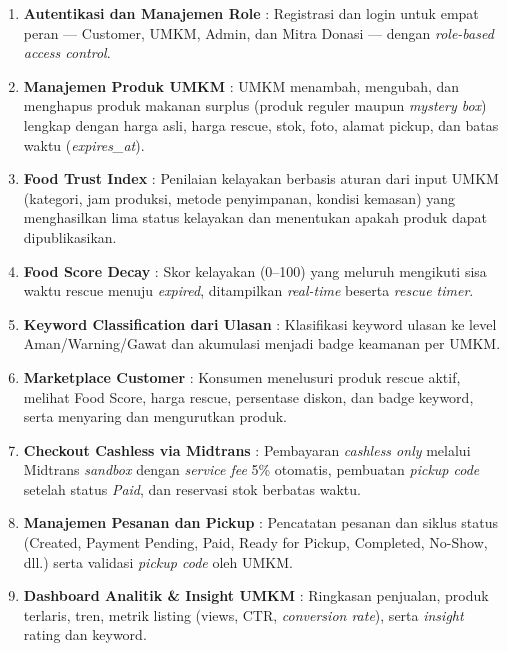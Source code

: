 \begin{enumerate}[leftmargin=*]
    \item \textbf{Autentikasi dan Manajemen Role} : Registrasi dan login untuk empat peran ---
    Customer, UMKM, Admin, dan Mitra Donasi --- dengan \textit{role-based access control}.

    \item \textbf{Manajemen Produk UMKM} : UMKM menambah, mengubah, dan menghapus produk makanan
    surplus (produk reguler maupun \textit{mystery box}) lengkap dengan harga asli, harga rescue,
    stok, foto, alamat pickup, dan batas waktu (\textit{expires\_at}).

    \item \textbf{Food Trust Index} : Penilaian kelayakan berbasis aturan dari input UMKM
    (kategori, jam produksi, metode penyimpanan, kondisi kemasan) yang menghasilkan lima status
    kelayakan dan menentukan apakah produk dapat dipublikasikan.

    \item \textbf{Food Score Decay} : Skor kelayakan (0--100) yang meluruh mengikuti sisa waktu
    rescue menuju \textit{expired}, ditampilkan \textit{real-time} beserta \textit{rescue timer}.

    \item \textbf{Keyword Classification dari Ulasan} : Klasifikasi keyword ulasan ke level
    Aman/Warning/Gawat dan akumulasi menjadi badge keamanan per UMKM.

    \item \textbf{Marketplace Customer} : Konsumen menelusuri produk rescue aktif, melihat Food
    Score, harga rescue, persentase diskon, dan badge keyword, serta menyaring dan mengurutkan produk.

    \item \textbf{Checkout Cashless via Midtrans} : Pembayaran \textit{cashless only} melalui Midtrans
    \textit{sandbox} dengan \textit{service fee} 5\% otomatis, pembuatan \textit{pickup code} setelah
    status \textit{Paid}, dan reservasi stok berbatas waktu.

    \item \textbf{Manajemen Pesanan dan Pickup} : Pencatatan pesanan dan siklus status (Created,
    Payment Pending, Paid, Ready for Pickup, Completed, No-Show, dll.) serta validasi \textit{pickup
    code} oleh UMKM.

    \item \textbf{Dashboard Analitik \& Insight UMKM} : Ringkasan penjualan, produk terlaris, tren,
    metrik listing (views, CTR, \textit{conversion rate}), serta \textit{insight} rating dan keyword.


\end{enumerate}
